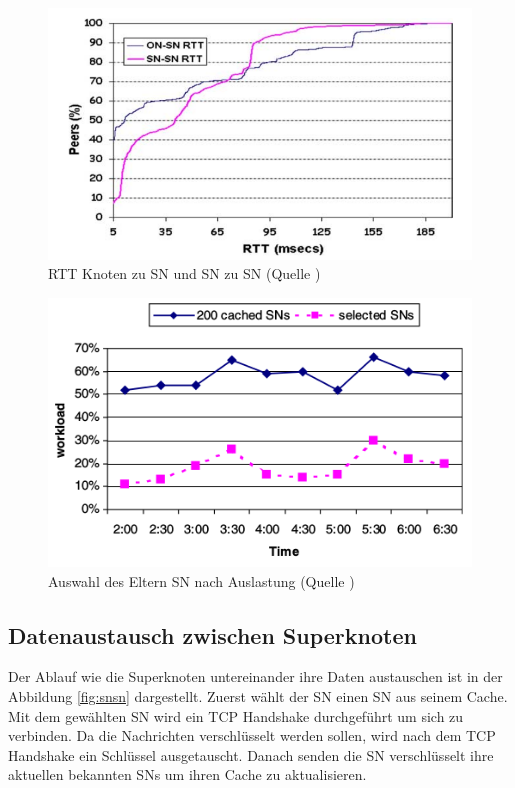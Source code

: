 \begin{figure}
\includegraphics[scale=0.3]{gfx/rttSns}
\caption{RTT Knoten zu SN und SN zu SN (Quelle \cite{liang2006fasttrack})}
\label{fig:rtt}
\end{figure}

\begin{figure}
\includegraphics[scale=0.45]{gfx/workload}
\caption{Auswahl des Eltern SN nach Auslastung (Quelle \cite{liang2006fasttrack})}
\label{fig:workl}
\end{figure}

\subsection{Datenaustausch zwischen Superknoten}
\label{subsec:sntosn}

Der Ablauf wie die Superknoten untereinander ihre Daten austauschen ist in der Abbildung \ref{fig:snsn} dargestellt.
Zuerst wählt der SN einen SN aus seinem Cache.
Mit dem gewählten SN wird ein TCP Handshake durchgeführt um sich zu verbinden.
Da die Nachrichten verschlüsselt werden sollen, wird nach dem TCP Handshake ein Schlüssel ausgetauscht.
Danach senden die SN verschlüsselt ihre aktuellen bekannten SNs um ihren Cache zu aktualisieren.

